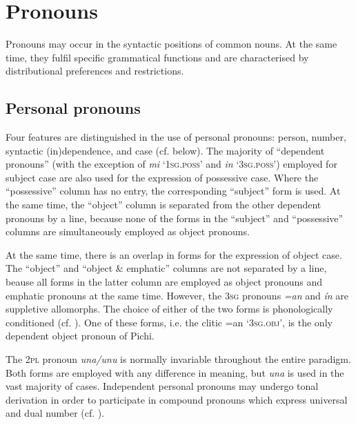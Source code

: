 \section{Pronouns}\label{sec:5.4}

Pronouns may occur in the syntactic positions of common nouns. At the same time, they fulfil specific grammatical functions and are characterised by distributional preferences and restrictions. 

\subsection{Personal pronouns}\label{sec:5.4.1}

Four features are distinguished in the use of personal pronouns: person, number, syntactic (in)dependence, and case (cf.  below). The majority of “dependent pronouns” (with the exception of \textit{mi} ‘\textsc{1sg.poss}’ and \textit{in} ‘\textsc{3sg.poss}’) employed for subject case are also used for the expression of possessive case. Where the “possessive” column has no entry, the corresponding “subject” form is used. At the same time, the “object” column is separated from the other dependent pronouns by a line, because none of the forms in the “subject” and “possessive” columns are simultaneously employed as object pronouns. 


At the same time, there is an overlap in forms for the expression of object case. The “object” and “object \& emphatic” columns are not separated by a line, beause all forms in the latter column are employed as object pronouns and emphatic pronouns at the same time. However, the \textsc{3sg} pronouns \textit{=an} and \textit{ín} are suppletive allomorphs. The choice of either of the two forms is phonologically conditioned (cf. ). One of these forms, i.e. the clitic =an ‘\textsc{3sg.obj’,} is the only dependent object pronoun of Pichi. 



The \textsc{2pl} pronoun \textit{una}\textit{\textup{/}}\textit{unu} is normally invariable throughout the entire paradigm. Both forms are employed with any difference in meaning, but \textit{una} is used in the vast majority of cases. Independent personal pronouns may undergo tonal derivation in order to participate in compound pronouns which express universal and dual number (cf. ). 


